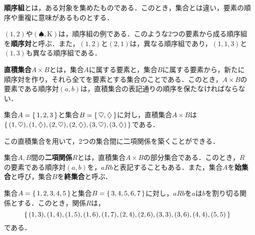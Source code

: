 \begin{definition}[順序組] %
	\textbf{順序組}とは，ある対象を集めたものである．このとき，集合とは違い，要素の順序や重複に意味があるものとする．
\end{definition}
\begin{example*}
	$(1, 2)$や$(\spadesuit, \text{K})$は，順序組の例である．このような2つの要素から成る順序組を\textbf{順序対}と呼ぶ．また，$(1, 2)$と$(2, 1)$は，異なる順序組であり，$(1, 1, 3)$と$(1, 3)$も異なる順序組である．
\end{example*}
\begin{definition}[直積集合] %
	\textbf{直積集合}$A \times B$とは，集合$A$に属する要素と，集合$B$に属する要素から，新たに順序対を作り，それら全てを要素とする集合のことである．このとき，$A \times B$の要素である順序対$(a, b)$は，直積集合の表記通りの順序を保たなければならない．
\end{definition}
\begin{example*}
	集合$A=\left\{\,1,2,3\,\right\}$と集合$B=\left\{\,\heartsuit,\diamondsuit\,\right\}$に対し，直積集合$A \times B$は$\left\{\,(1, \heartsuit),(1,\diamondsuit),(2, \heartsuit),(2,\diamondsuit),(3, \heartsuit),(3,\diamondsuit)\,\right\}$である．
\end{example*}

この直積集合を用いて，2つの集合間に二項関係を築くことができる．
\begin{definition}[二項関係] %
	集合$A, B$間の\textbf{二項関係}$R$とは，直積集合$A \times B$の部分集合である．このとき，$R$の要素である順序対$(a,b)$を，$aRb$と表記することもある．また，集合$A$を\textbf{始集合}と呼び，集合$B$を\textbf{終集合}と呼ぶ．
\end{definition}
\begin{example*}
	集合$A=\left\{\,1,2,3,4,5\,\right\}$と集合$B=\left\{\,3,4,5,6,7\,\right\}$に対し，$aRb$を$a$は$b$を割り切る関係とする．このとき，関係$R$は，
	\[
		\left\{\,(1,3),(1,4),(1,5),(1,6),(1,7),(2,4),(2,6),(3,3),(3,6),(4,4),(5,5)\,\right\}
	\]
	である．
\end{example*}

